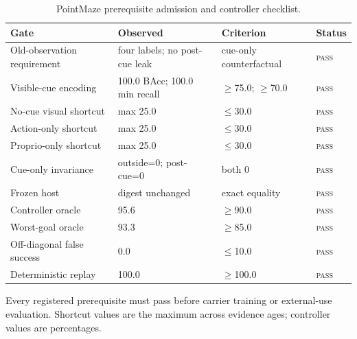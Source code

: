 \begin{table}[H]
\centering
\footnotesize
\setlength{\tabcolsep}{4pt}
\renewcommand{\arraystretch}{1.10}
\caption{PointMaze prerequisite admission and controller checklist.}
\label{tab:appendix-pointmaze-gates}
\begin{tabular}{lp{}ll}
\toprule
Gate & Observed & Criterion & Status \\
\midrule
Old-observation requirement & four labels; no post-cue leak & cue-only counterfactual & \textsc{pass} \\
Visible-cue encoding & 100.0 BAcc; 100.0 min recall & $\geq$75.0; $\geq$70.0 & \textsc{pass} \\
No-cue visual shortcut & max 25.0 & $\leq$30.0 & \textsc{pass} \\
Action-only shortcut & max 25.0 & $\leq$30.0 & \textsc{pass} \\
Proprio-only shortcut & max 25.0 & $\leq$30.0 & \textsc{pass} \\
Cue-only invariance & outside=0; post-cue=0 & both 0 & \textsc{pass} \\
Frozen host & digest unchanged & exact equality & \textsc{pass} \\
Controller oracle & 95.6 & $\geq$90.0 & \textsc{pass} \\
Worst-goal oracle & 93.3 & $\geq$85.0 & \textsc{pass} \\
Off-diagonal false success & 0.0 & $\leq$10.0 & \textsc{pass} \\
Deterministic replay & 100.0 & $\geq$100.0 & \textsc{pass} \\
\bottomrule
\end{tabular}
\vspace{2pt}
\parbox{0.98\textwidth}{\scriptsize Every registered prerequisite must pass before carrier training or external-use evaluation. Shortcut values are the maximum across evidence ages; controller values are percentages.}
\end{table}
